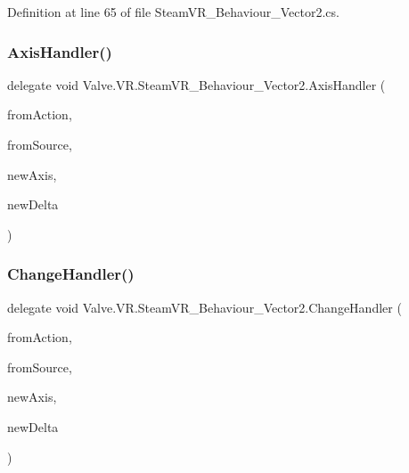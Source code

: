 Definition at line 65 of file Steam\+V\+R\+\_\+\+Behaviour\+\_\+\+Vector2.\+cs.

\mbox{\label{class_valve_1_1_v_r_1_1_steam_v_r___behaviour___vector2_a8d32523a44d5d8f20a99caf00f35020d}} 
\subsubsection{\texorpdfstring{AxisHandler()}{AxisHandler()}}
{\footnotesize\ttfamily delegate void Valve.\+V\+R.\+Steam\+V\+R\+\_\+\+Behaviour\+\_\+\+Vector2.\+Axis\+Handler (\begin{DoxyParamCaption}\item[{\mbox{\hyperlink{class_valve_1_1_v_r_1_1_steam_v_r___behaviour___vector2}{Steam\+V\+R\+\_\+\+Behaviour\+\_\+\+Vector2}}}]{from\+Action,  }\item[{\mbox{\hyperlink{namespace_valve_1_1_v_r_a82e5bf501cc3aa155444ee3f0662853f}{Steam\+V\+R\+\_\+\+Input\+\_\+\+Sources}}}]{from\+Source,  }\item[{Vector2}]{new\+Axis,  }\item[{Vector2}]{new\+Delta }\end{DoxyParamCaption})}

\mbox{\label{class_valve_1_1_v_r_1_1_steam_v_r___behaviour___vector2_aae8467eb06531543c1ea5b6033b53495}} 
\subsubsection{\texorpdfstring{ChangeHandler()}{ChangeHandler()}}
{\footnotesize\ttfamily delegate void Valve.\+V\+R.\+Steam\+V\+R\+\_\+\+Behaviour\+\_\+\+Vector2.\+Change\+Handler (\begin{DoxyParamCaption}\item[{\mbox{\hyperlink{class_valve_1_1_v_r_1_1_steam_v_r___behaviour___vector2}{Steam\+V\+R\+\_\+\+Behaviour\+\_\+\+Vector2}}}]{from\+Action,  }\item[{\mbox{\hyperlink{namespace_valve_1_1_v_r_a82e5bf501cc3aa155444ee3f0662853f}{Steam\+V\+R\+\_\+\+Input\+\_\+\+Sources}}}]{from\+Source,  }\item[{Vector2}]{new\+Axis,  }\item[{Vector2}]{new\+Delta }\end{DoxyParamCaption})}

